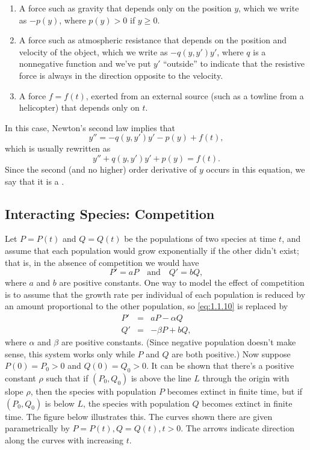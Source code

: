 \documentclass{ximera}
\begin{document}
\begin{enumerate}
\item %
A force such as gravity that depends only on the position $y$,
which we write as $-p(y)$, where $p(y)>0$ if $y\ge0$.
 
\item %
A force such as atmospheric resistance that depends on
the position and velocity of the object, which we write as
$-q(y,y')y'$, where $q$ is a nonnegative function and we've
put $y'$ ``outside'' to indicate that the resistive force is
always in the direction opposite to the velocity.
\item %
A force $f=f(t)$, exerted from an external source (such as a towline
from a helicopter) that depends only on $t$.
\end{enumerate}
 
In this case, Newton's second law implies that
$$
y''=-q(y,y')y'-p(y)+f(t),
$$
which is usually rewritten as
$$
y''+q(y,y')y'+p(y)=f(t).
$$
Since the  second (and no higher) order derivative of $y$ occurs in
this equation, we say that it is a .
 
 
 
\subsection*{Interacting Species: Competition}
 
Let $P=P(t)$ and $Q=Q(t)$ be the populations of two species at time
$t$, and assume that each population would grow exponentially if the
other didn't exist; that is, in the absence of competition we would
have
\begin{equation} \label{eq:1.1.10}
P'=aP \quad\text{and}\quad Q'=bQ,
\end{equation}
where $a$ and $b$ are positive constants. One way to model the effect
of competition is to assume that the growth rate per individual of
each population is reduced by an amount proportional to the other
population, so \eqref{eq:1.1.10} is replaced by
\begin{eqnarray*}
P'&=&aP-\alpha Q\\
Q'&=&-\beta P+bQ,
\end{eqnarray*}
where $\alpha$ and $\beta$ are positive constants. (Since negative
population doesn't make sense, this system works only while $P$ and
$Q$ are both positive.) Now suppose   $P(0)=P_0>0$ and
$Q(0)=Q_0>0$. It can be shown %
that there's a  positive constant $\rho$ such that if
$(P_0,Q_0)$ is above the line $L$ through the origin with slope $\rho$,
then the species with population $P$ becomes extinct in finite time,
but if $(P_0,Q_0)$ is below $L$,   the species with population
$Q$ becomes extinct in finite time. The figure below illustrates
this. The curves shown there are given parametrically by $P=P(t),
Q=Q(t), t>0$.
 The arrows indicate direction along the curves with
increasing $t$.
\end{document}
